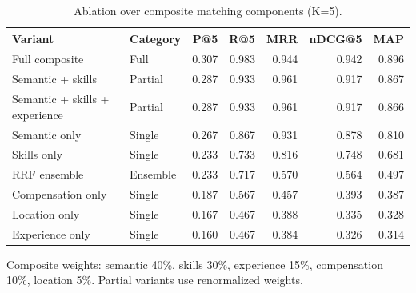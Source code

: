 \begin{table}[htbp]
\centering
\caption{Ablation over composite matching components (K=5).}
\label{tab:ablation}
\begin{tabular}{llrrrrr}
\toprule
Variant & Category & P@5 & R@5 & MRR & nDCG@5 & MAP \\
\midrule
Full composite & Full & 0.307 & 0.983 & 0.944 & 0.942 & 0.896 \\
Semantic + skills & Partial & 0.287 & 0.933 & 0.961 & 0.917 & 0.867 \\
Semantic + skills + experience & Partial & 0.287 & 0.933 & 0.961 & 0.917 & 0.866 \\
Semantic only & Single & 0.267 & 0.867 & 0.931 & 0.878 & 0.810 \\
Skills only & Single & 0.233 & 0.733 & 0.816 & 0.748 & 0.681 \\
RRF ensemble & Ensemble & 0.233 & 0.717 & 0.570 & 0.564 & 0.497 \\
Compensation only & Single & 0.187 & 0.567 & 0.457 & 0.393 & 0.387 \\
Location only & Single & 0.167 & 0.467 & 0.388 & 0.335 & 0.328 \\
Experience only & Single & 0.160 & 0.467 & 0.384 & 0.326 & 0.314 \\
\bottomrule
\end{tabular}
\footnotesize{Composite weights: semantic 40\%, skills 30\%, experience 15\%, compensation 10\%, location 5\%. Partial variants use renormalized weights.}
\end{table}
